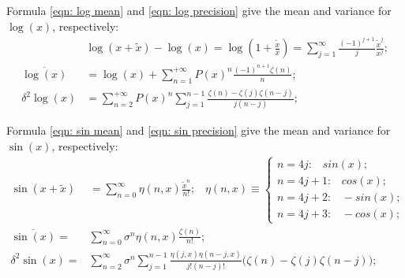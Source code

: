 \documentclass[twoside]{article}
\numberwithin{equation}{section}
\newcommand{\eqspace}{\;\;\;}
\begin{document}
Formula \eqref{eqn: log mean} and \eqref{eqn: log precision} give the mean and variance for $\log(x)$, respectively:
\begin{align}
\label{eqn: log Taylor}
& \log(x + \tilde{x}) - \log(x) = \log(1 + \frac{\tilde{x}}{x}) = \sum_{j=1}^{\infty} \frac{(-1)^{j+1}}{j} \frac{\tilde{x}^j}{x^j}; \\
\label{eqn: log mean}
\overline{\log(x)}  &= \log(x) + \sum_{n=1}^{+\infty} P(x)^{n} \frac{(-1)^{n+1} \zeta(n)}{n}; \\
\label{eqn: log precision}
\delta^2 \log(x) &= \sum_{n=2}^{+\infty} P(x)^{n} \sum_{j=1}^{n-1} \frac{\zeta(n) - \zeta(j) \zeta(n - j)}{j (n-j)};
\end{align}

Formula \eqref{eqn: sin mean} and \eqref{eqn: sin precision} give the mean and variance for $\sin(x)$, respectively:
\begin{align}
\label{eqn: sin Taylor}
\sin(x + \tilde{x}) &= \sum_{n=0}^{\infty} \eta(n, x) \frac{\tilde{x}^{n}}{n!};
	\eqspace \eta(n, x) \equiv \begin{cases} 
		n = 4j: \eqspace  sin(x); \\ n = 4j + 1: \eqspace  cos(x); \\ n = 4j + 2: \eqspace  -sin(x); \\ n = 4j +3: \eqspace  -cos(x); 
	\end{cases} \\
\label{eqn: sin mean}
\overline{\sin(x)} =& \sum_{n=0}^{\infty} \sigma^n \eta(n, x) \frac{\zeta(n)}{n!}; \\
\label{eqn: sin precision}
\delta^2 \sin(x) =& \sum_{n=2}^{\infty} \sigma^n \sum_{j=1}^{n-1} \frac{\eta(j, x)\eta(n - j, x)}{j! (n-j)!}
      	\big(\zeta(n) - \zeta(j) \zeta(n - j)\big); 
\end{align}
\end{document}
